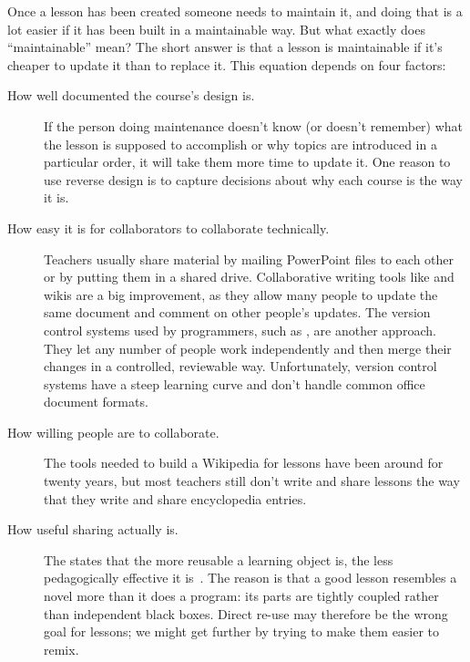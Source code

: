 
Once a lesson has been created someone needs to maintain it,
and doing that is a lot easier if it has been built in a maintainable way.
But what exactly does ``maintainable'' mean?
The short answer is that a lesson is maintainable
if it's cheaper to update it than to replace it.
This equation depends on four factors:

\begin{description}

\item[How well documented the course's design is.]
  If the person doing maintenance doesn't know (or doesn't remember)
  what the lesson is supposed to accomplish
  or why topics are introduced in a particular order,
  it will take them more time to update it.
  One reason to use reverse design
  is to capture decisions about why each course is the way it is.

\item[How easy it is for collaborators to collaborate technically.]
  Teachers usually share material by mailing PowerPoint files to each other
  or by putting them in a shared drive.
  Collaborative writing tools like  and wikis
  are a big improvement,
  as they allow many people to update the same document and comment on other people's updates.
  The version control systems used by programmers,
  such as ,
  are another approach.
  They let any number of people work independently
  and then merge their changes in a controlled, reviewable way.
  Unfortunately,
  version control systems have a steep learning curve
  and don't handle common office document formats.

\item[How willing people are to collaborate.]
  The tools needed to build a Wikipedia for lessons have been around for twenty years,
  but most teachers still don't write and share lessons
  the way that they write and share encyclopedia entries.

\item[How useful sharing actually is.]
  The  states that
  the more reusable a learning object is,
  the less pedagogically effective it is~\cite{Wile2002}.
  The reason is that a good lesson resembles a novel more than it does a program:
  its parts are tightly coupled rather than independent black boxes.
  Direct re-use may therefore be the wrong goal for lessons;
  we might get further by trying to make them easier to remix.

\end{description}

